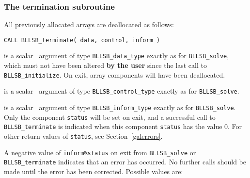 \documentclass{galahad}
\newcommand{\packagename}{BLLSB}
\begin{document}

\subsubsection{The  termination subroutine}
All previously allocated arrays are deallocated as follows:
\vspace*{1mm}

\hspace{8mm}
{\tt CALL \packagename\_terminate( data, control, inform )}

\vspace*{-3mm}
\begin{description}

 is a scalar \intentinout\ argument of type
{\tt \packagename\_data\_type}
exactly as for
{\tt \packagename\_solve},
which must not have been altered {\bf by the user} since the last call to
{\tt \packagename\_initialize}.
On exit, array components will have been deallocated.

 is a scalar \intentin\ argument of type
{\tt \packagename\_control\_type}
exactly as for
{\tt \packagename\_solve}.

 is a scalar \intentout\ argument of type
{\tt \packagename\_inform\_type}
exactly as for
{\tt \packagename\_solve}.
Only the component {\tt status} will be set on exit, and a
successful call to
{\tt \packagename\_terminate}
is indicated when this  component {\tt status} has the value 0.
For other return values of {\tt status}, see Section~\ref{galerrors}.

\end{description}



\galerrors
A negative value of {\tt inform\%status} on exit from
{\tt \packagename\_solve}
or
{\tt \packagename\_terminate}
indicates that an error has occurred. No further calls should be made
until the error has been corrected. Possible values are:
\end{document}
